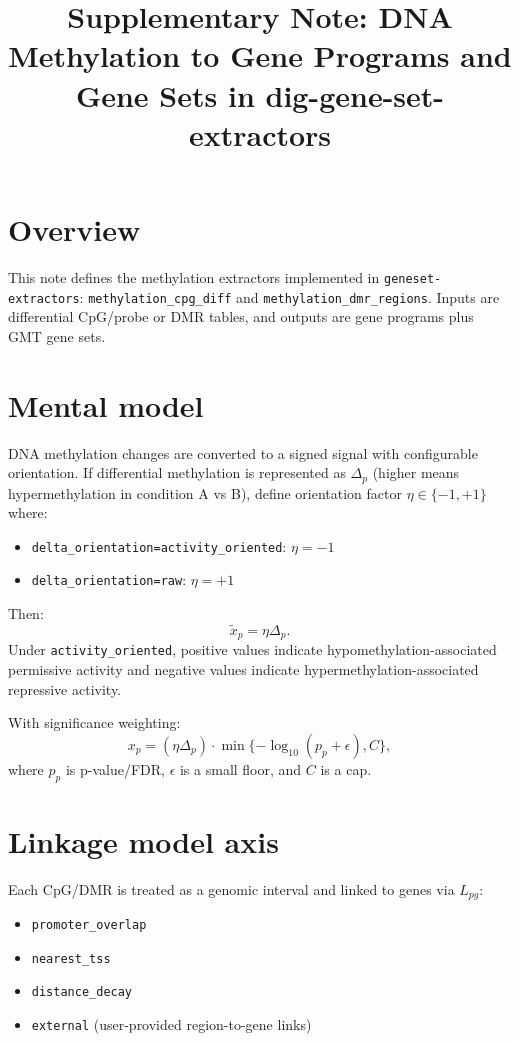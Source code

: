 \documentclass[11pt]{article}
\title{Supplementary Note: DNA Methylation to Gene Programs and Gene Sets in dig-gene-set-extractors}
\author{}
\date{}
\begin{document}
\maketitle

\section*{Overview}
This note defines the methylation extractors implemented in \texttt{geneset-extractors}:
\texttt{methylation\_cpg\_diff} and \texttt{methylation\_dmr\_regions}.
Inputs are differential CpG/probe or DMR tables, and outputs are gene programs plus GMT gene sets.

\section{Mental model}
DNA methylation changes are converted to a signed signal with configurable orientation.
If differential methylation is represented as $\Delta_p$ (higher means hypermethylation in condition A vs B),
define orientation factor $\eta \in \{-1,+1\}$ where:
\begin{itemize}[leftmargin=2em]
\item \texttt{delta\_orientation=activity\_oriented}: $\eta=-1$
\item \texttt{delta\_orientation=raw}: $\eta=+1$
\end{itemize}
Then:
\[
\tilde{x}_p = \eta \Delta_p.
\]
Under \texttt{activity\_oriented}, positive values indicate hypomethylation-associated permissive activity and negative values indicate hypermethylation-associated repressive activity.

With significance weighting:
\[
x_p = (\eta \Delta_p) \cdot \min\{-\log_{10}(p_p + \epsilon), C\},
\]
where $p_p$ is p-value/FDR, $\epsilon$ is a small floor, and $C$ is a cap.

\section{Linkage model axis}
Each CpG/DMR is treated as a genomic interval and linked to genes via $L_{pg}$:
\begin{itemize}[leftmargin=2em]
\item \texttt{promoter\_overlap}
\item \texttt{nearest\_tss}
\item \texttt{distance\_decay}
\item \texttt{external} (user-provided region-to-gene links)
\end{itemize}
\end{document}
